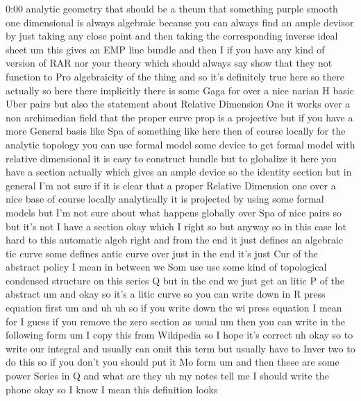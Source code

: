 \begin{unfinished}{0:00}
analytic  geometry  that  should  be  a  theum
that  something  purple  smooth  one
dimensional  is  always  algebraic  because
you  can  always  find  an  ample  devisor  by
just  taking  any  close  point  and  then
taking  the  corresponding  inverse  ideal
sheet  um  this  gives  an  EMP  line  bundle
and  then  I  if  you  have  any  kind  of
version  of  RAR  nor  your  theory  which
should  always  say  show  that  they  not
function  to  Pro  algebraicity  of  the
thing  and  so  it's  definitely  true  here
so  there
actually  so  here  there  implicitly  there
is  some  Gaga  for  over  a  nice  narian  H
basic  Uber  pairs  but  also  the  statement
about  Relative  Dimension  One  it  works
over  a  non  archimedian  field  that  the
proper
curve  prop  is  a  projective  but  if  you
have  a  more  General  basis  like  Spa  of
something  like  here  then  of  course
locally  for  the  analytic  topology  you
can  use  formal  model  some  device  to  get
formal  model  with  relative  dimensional
it  is  easy  to  construct  bundle  but  to
globalize  it  here  you  have  a  section
actually  which  gives  an  ample  device  so
the  identity  section  but  in  general  I'm
not  sure  if  it  is  clear  that  a  proper
Relative  Dimension  one  over  a  nice  base
of  course  locally  analytically  it  is
projected  by  using  some  formal  models
but  I'm  not  sure  about  what  happens
globally  over  Spa  of  nice  pairs  so  but
it's
not  I  have  a  section  okay  which
I  right  so  but  anyway  so  in  this  case
lot  hard  to  this  automatic  algeb
right  and  from  the  end  it  just  defines
an  algebraic  tic  curve  some  defines
antic
curve  over  just  in  the  end  it's  just  Cur
of  the  abstract  policy  I  mean  in  between
we  Som
use  use  some  kind  of  topological
condensed  structure  on  this  series  Q  but
in  the  end  we  just  get  an  litic  P  of  the
abstract
um  and  okay  so  it's  a  litic  curve  so  you
can  write  down  in  R  press  equation  first
um
and
uh  uh  so  if  you  write  down  the  wi  press
equation  I  mean  for  I  guess  if  you
remove  the  zero  section  as  usual  um  then
you  can  write  in  the  following
form
um  I  copy  this  from  Wikipedia  so  I  hope
it's
correct
uh  okay  so  to  write  our  integral  and
usually  can  omit  this  term
but  usually  have  to  Inver  two  to  do  this
so  if  you  don't  you  should  put  it  Mo
form
um  and  then  these  are  some  power  Series
in  Q  and  what  are  they  uh
my  notes  tell  me  I  should  write  the
phone
okay
so  I  know  I  mean  this  definition  looks

\end{unfinished}
